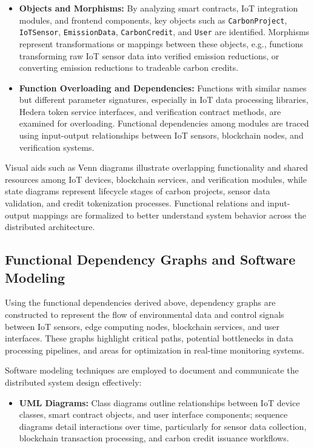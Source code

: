 \documentclass[oneside,a4paper,12pt]{book}
\begin{document}
\begin{appendices}
\begin{itemize}[leftmargin=*]
\item \textbf{Objects and Morphisms:} By analyzing smart contracts, IoT integration modules, and frontend components, key objects such as \texttt{CarbonProject}, \texttt{IoTSensor}, \texttt{EmissionData}, \texttt{CarbonCredit}, and \texttt{User} are identified. Morphisms represent transformations or mappings between these objects, e.g., functions transforming raw IoT sensor data into verified emission reductions, or converting emission reductions to tradeable carbon credits.

\item \textbf{Function Overloading and Dependencies:} Functions with similar names but different parameter signatures, especially in IoT data processing libraries, Hedera token service interfaces, and verification contract methods, are examined for overloading. Functional dependencies among modules are traced using input-output relationships between IoT sensors, blockchain nodes, and verification systems.
\end{itemize}

Visual aids such as Venn diagrams illustrate overlapping functionality and shared resources among IoT devices, blockchain services, and verification modules, while state diagrams represent lifecycle stages of carbon projects, sensor data validation, and credit tokenization processes. Functional relations and input-output mappings are formalized to better understand system behavior across the distributed architecture.

\subsection{Functional Dependency Graphs and Software Modeling}
Using the functional dependencies derived above, dependency graphs are constructed to represent the flow of environmental data and control signals between IoT sensors, edge computing nodes, blockchain services, and user interfaces. These graphs highlight critical paths, potential bottlenecks in data processing pipelines, and areas for optimization in real-time monitoring systems.

Software modeling techniques are employed to document and communicate the distributed system design effectively:

\begin{itemize}[leftmargin=*]
\item \textbf{UML Diagrams:} Class diagrams outline relationships between IoT device classes, smart contract objects, and user interface components; sequence diagrams detail interactions over time, particularly for sensor data collection, blockchain transaction processing, and carbon credit issuance workflows.


\end{itemize}
\end{appendices}
\end{document}
